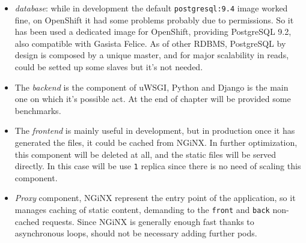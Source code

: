 \begin{itemize}
\itemsep1pt\parskip0pt
\item
  \emph{database}: while in development the default
  \texttt{postgresql:9.4} image worked fine, on OpenShift it had some
  problems probably due to permissions. So it has been used a dedicated
  image for OpenShift, providing PostgreSQL 9.2, also compatible with
  Gasista Felice. As of other RDBMS, PostgreSQL by design is composed by
  a unique master, and for major scalability in reads, could be setted
  up some slaves but it's not needed.
\item
  The \emph{backend} is the component of uWSGI, Python and Django is the
  main one on which it's possible act. At the end of chapter will be
  provided some benchmarks.
\item
  The \emph{frontend} is mainly useful in development, but in production
  once it has generated the files, it could be cached from NGiNX. In
  further optimization, this component will be deleted at all, and the
  static files will be served directly. In this case will be use
  \texttt{1} replica since there is no need of scaling this component.
\item
  \emph{Proxy} component, NGiNX represent the entry point of the
  application, so it manages caching of static content, demanding to the
  \texttt{front} and \texttt{back} non-cached requests. Since NGiNX is
  generally enough fast thanks to asynchronous loops, should not be
  necessary adding further pods.
\end{itemize}